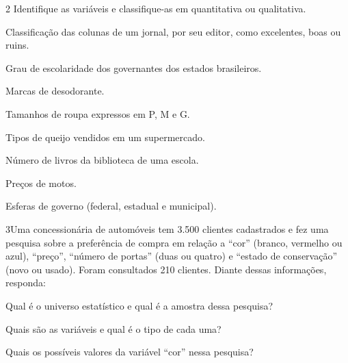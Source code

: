 \num{2} Identifique as variáveis e classifique-as em quantitativa 
ou qualitativa.

\begin{escolha}
\item
  Classificação das colunas de um jornal, por seu editor, como
  excelentes, boas ou ruins.


\item
  Grau de escolaridade dos governantes dos estados brasileiros.


\item
  Marcas de desodorante.


\item
  Tamanhos de roupa expressos em P, M e G.


\item
  Tipos de queijo vendidos em um supermercado.


\item
  Número de livros da biblioteca de uma escola.


\item
  Preços de motos.


\item
  Esferas de governo (federal, estadual e municipal).

\end{escolha}


\num{3}Uma concessionária de automóveis tem 3.500 clientes cadastrados e
fez uma pesquisa sobre a preferência de compra em relação a ``cor''
(branco, vermelho ou azul), ``preço'', ``número de portas'' (duas ou
quatro) e ``estado de conservação'' (novo ou usado). Foram consultados
210 clientes. Diante dessas informações, responda:

\begin{escolha}
\item
  Qual é o universo estatístico e qual é a amostra dessa pesquisa?


\item
  Quais são as variáveis e qual é o tipo de cada uma?


\item
  Quais os possíveis valores da variável ``cor'' nessa pesquisa?

\end{escolha}

